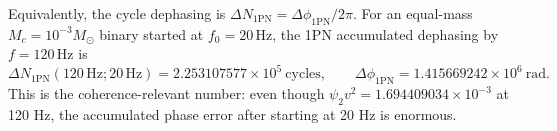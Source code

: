 \documentclass[11pt]{article}
\begin{document}
Equivalently, the cycle dephasing is
$\Delta N_{\mathrm{1PN}}=\Delta\phi_{\mathrm{1PN}}/2\pi$. For an equal-mass
$M_c=10^{-3}M_\odot$ binary started at $f_0=20\,\mathrm{Hz}$, the 1PN
accumulated dephasing by $f=120\,\mathrm{Hz}$ is
\begin{equation}
    \Delta N_{\mathrm{1PN}}(120\,\mathrm{Hz};20\,\mathrm{Hz})
    =
    2.253107577\times10^5\ \mathrm{cycles},
    \qquad
    \Delta\phi_{\mathrm{1PN}}
    =
    1.415669242\times10^6\ \mathrm{rad}.
    \label{eq:numeric_dephasing}
\end{equation}
This is the coherence-relevant number: even though
$\psi_2v^2=1.694409034\times10^{-3}$ at 120 Hz, the accumulated phase error
after starting at 20 Hz is enormous.
\end{document}
